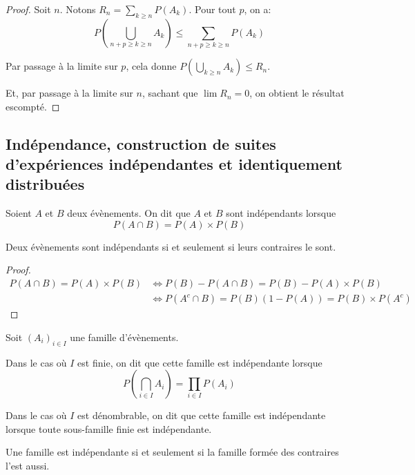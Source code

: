 \begin{proof}
Soit $n$. Notons $R_n = \displaystyle{\sum \limits_{k \geq n}} P(A_k)$. Pour tout $p$, on a:
\[
P \left ( \bigcup \limits_{n+p \geq k \geq n} A_k \right ) \leq \displaystyle{\sum \limits_{n+p \geq k \geq n}} P(A_k)
\]

Par passage à la limite sur $p$, cela donne $
P \left ( \bigcup \limits_{k \geq n} A_k \right ) \leq R_n
$.

Et, par passage à la limite sur $n$, sachant que $\lim R_n = 0$, on obtient le résultat escompté.
\end{proof}


\subsection{Indépendance, construction de suites d'expériences indépendantes et identiquement distribuées}

\begin{de}
Soient $A$ et $B$ deux évènements. On dit que $A$ et $B$ sont indépendants lorsque 
\[
P(A \cap B) = P(A) \times P(B)
\]
\end{de}


\begin{prop}
Deux évènements sont indépendants si et seulement si leurs contraires le sont.
\end{prop}

\begin{proof}
\begin{align*}
P(A \cap B) = P(A) \times P(B) & \iff P(B)-P(A \cap B) = P(B)-P(A) \times P(B) \\
 & \iff P(A^c \cap B) = P(B) \left(1-P(A)\right) = P(B) \times P(A^c)
\end{align*}
\end{proof}


\begin{de}
Soit $(A_i)_{i \in I}$ une famille d'évènements. 

Dans le cas où $I$ est finie, on dit que cette famille est indépendante lorsque 
\[
P\left(\bigcap \limits_{i \in I} A_i\right) = \displaystyle{\prod \limits_{i \in I}} P(A_i)
\]

Dans le cas où $I$ est dénombrable, on dit que cette famille est indépendante lorsque toute sous-famille finie est indépendante.
\end{de}

\begin{prop}
Une famille est indépendante si et seulement si la famille formée des contraires l'est aussi.
\end{prop}


